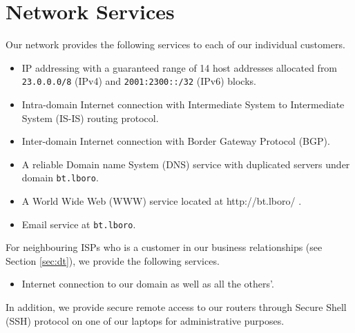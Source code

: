 \section{Network Services}
\label{sec:services}

Our network provides the following services to each of our individual customers.

\begin{itemize}
\item
	IP addressing with a guaranteed range of 14 host addresses allocated from \texttt{23.0.0.0/8} (IPv4) and \texttt{2001:2300::/32} (IPv6) blocks.
\item
	Intra-domain Internet connection with Intermediate System to Intermediate System (IS-IS) routing protocol.
\item
	Inter-domain Internet connection with Border Gateway Protocol (BGP).
\item
	A reliable Domain name System (DNS) service with duplicated servers under domain \texttt{bt.lboro}.
\item
	A World Wide Web (WWW) service located at http://bt.lboro/ .
\item
	Email service at \texttt{bt.lboro}.
\end{itemize}



For neighbouring ISPs who is a customer in our business relationships (see Section \ref{sec:dt}), we provide the following services.

\begin{itemize}
\item
	Internet connection to our domain as well as all the others'.
\end{itemize}



In addition, we provide secure remote access to our routers through Secure Shell (SSH) protocol on one of our laptops for administrative purposes.

